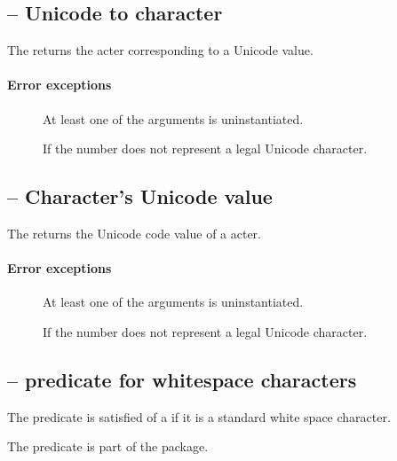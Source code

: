 \subsection{ -- Unicode to character}
\label{chars:charof}

The  returns the acter corresponding to a Unicode value.
    
\paragraph{Error exceptions}
\begin{description}
\item[]
At least one of the arguments is uninstantiated.
\item[]
If the number does not represent a legal Unicode character.
\end{description}

\subsection{ -- Character's Unicode value}
\label{chars:charcode}

The  returns the Unicode code value of a acter.
    
\paragraph{Error exceptions}
\begin{description}
\item[]
At least one of the arguments is uninstantiated.
\item[]
If the number does not represent a legal Unicode character.
\end{description}

\subsection{ -- predicate for whitespace characters}
\label{stdparse:whitespace}

The  predicate is satisfied of a  if it is a standard white space character.

The  predicate is part of the  package.

